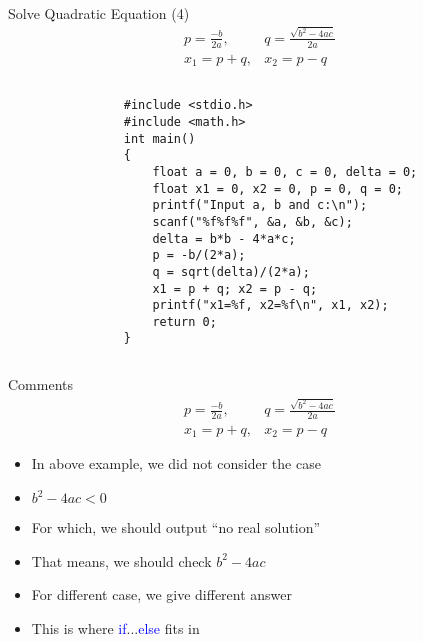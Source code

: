 \begin{frame}[fragile]{Solve Quadratic Equation (4)}
\vspace{-0.3in}
\begin{eqnarray}
p=\frac{-b}{2a}, & q=\frac{\sqrt{b^2-4ac}}{2a} \nonumber \\
x_1=p+q, & x_2=p-q \nonumber
\end{eqnarray}
\vspace{-0.25in}
	\begin{columns}
		\begin{column}{0.1\linewidth}
		\end{column}
		\begin{column}{0.9\linewidth}
	\begin{lstlisting}[]
#include <stdio.h>
#include <math.h>
int main()
{
    float a = 0, b = 0, c = 0, delta = 0;
    float x1 = 0, x2 = 0, p = 0, q = 0;
    printf("Input a, b and c:\n");
    scanf("%f%f%f", &a, &b, &c);
    delta = b*b - 4*a*c;
    p = -b/(2*a);
    q = sqrt(delta)/(2*a);
    x1 = p + q; x2 = p - q;
    printf("x1=%f, x2=%f\n", x1, x2);
    return 0;
}
	\end{lstlisting}
	\end{column}
\end{columns}
\end{frame}

\begin{frame}[fragile]{Comments}
\vspace{-0.25in}
\begin{eqnarray}
p=\frac{-b}{2a}, & q=\frac{\sqrt{b^2-4ac}}{2a} \nonumber \\
x_1=p+q, & x_2=p-q \nonumber
\end{eqnarray}
\begin{itemize}
	\item {In above example, we did not consider the case}
	\item {${b^2-4ac} < 0$}
	\item {For which, we should output ``no real solution''}
	\item {That means, we should check ${b^2-4ac}$}
	\item {For different case, we give different answer}
	\item {This is where \textcolor{blue}{if}...\textcolor{blue}{else} fits in}
\end{itemize}

\end{frame}

